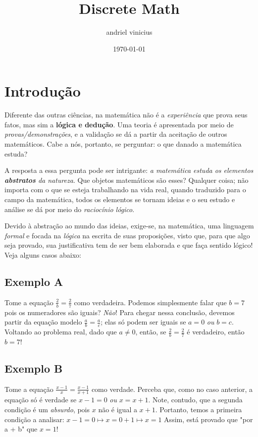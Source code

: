\documentclass{article}
\title{Discrete Math}
\author{andriel vinicius}
\date{\today}
\begin{document}
\maketitle

\section{Introdução}
\par
Diferente das outras ciências, na matemática não é a \emph{experiência} que prova seus fatos, mas sim a \textbf{lógica e dedução}.
Uma teoria é apresentada por meio de \emph{provas/demonstrações}, e a validação se dá a partir da aceitação de outros matemáticos. Cabe a nós, portanto, se perguntar: o que danado a matemática estuda?
\par
A resposta a essa pergunta pode ser intrigante: \textit{a matemática estuda os elementos \textbf{abstratos} da natureza}. Que objetos matemáticos são esses? Qualquer coisa; não importa com o que se esteja trabalhando na vida real, quando traduzido para o campo da matemática, todos os elementos se tornam ideias e o seu estudo e análise se dá por meio do \emph{raciocínio lógico}.
\par
Devido à abstração ao mundo das ideias, exige-se, na matemática, uma linguagem \emph{formal} e focada na \emph{lógica} na escrita de suas proposições, visto que, para que algo seja provado, sua justificativa tem de ser bem elaborada e que faça sentido lógico! Veja alguns casos abaixo:
\subsection{Exemplo A}
Tome a equação $\frac{2}{b} = \frac{2}{7} $ como verdadeira. Podemos simplesmente falar que $ b = 7 $ pois os numeradores são iguais? \emph{Não}! Para chegar nessa conclusão, devemos partir da equação modelo $ \frac{a}{b} = \frac{a}{c} $; elas só podem ser iguais se $a = 0$ \emph{ou} $b = c$. Voltando ao problema real, dado que $ a \ne 0 $, então, se $\frac{2}{b} = \frac{2}{7}$ é verdadeiro, então $b = 7$!
\subsection{Exemplo B}
Tome a equação $ \frac{x-1}{x} = \frac{x - 1}{ x + 1} $ como verdade. Perceba que, como no caso anterior, a equação só é verdade se $x - 1 = 0$ \emph{ou} $x = x + 1$. Note, contudo, que a segunda condição é um \emph{absurdo}, pois $x$ não é igual a $x + 1$. Portanto, temos a primeira condição a analisar:
\begin{math}
x - 1 = 0
\mapsto x = 0 + 1
\mapsto x = 1
\end{math}
Assim, está provado que "por a + b" que $ x = 1 $!
\end{document}
